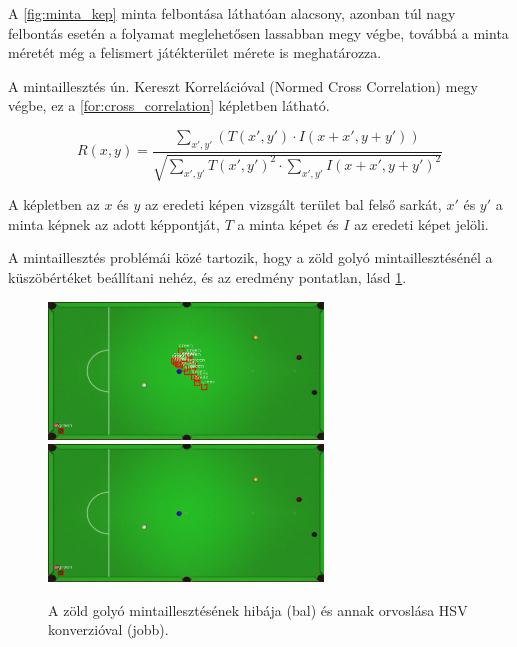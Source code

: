 \par A \ref{fig:minta_kep} minta felbontása láthatóan alacsony, azonban túl nagy felbontás esetén a folyamat meglehetősen lassabban megy végbe, továbbá a minta méretét még a felismert játékterület mérete is meghatározza.
\par A mintaillesztés ún. Kereszt Korrelációval (Normed Cross Correlation) megy végbe, ez a \ref{for:cross_correlation} képletben látható\cite{kaehler2016learning, opencv_docs}.

\begin{equation}
    R(x, y) = \frac{\sum_{x',y'}(T(x',y') \cdot I(x + x', y + y'))}{\sqrt{\sum_{x',y'}T(x',y')^2 \cdot \sum_{x',y'}I(x + x',y + y')^2}}
    \label{for:cross_correlation}
\end{equation}

\par A képletben az $x$ és $y$ az eredeti képen vizsgált terület bal felső sarkát, $x'$ és $y'$ a minta képnek az adott képpontját, $T$ a minta képet és $I$ az eredeti képet jelöli.
\par A mintaillesztés problémái közé tartozik, hogy a zöld golyó mintaillesztésénél a küszöbértéket beállítani nehéz, és az eredmény pontatlan, lásd \ref{fig:rossz_zold}.

\begin{figure}[!ht]
    \centering
    \includegraphics[width=73mm, keepaspectratio]{figures/wrong_green.png}\hspace{2mm}
	\includegraphics[width=73mm, keepaspectratio]{figures/green_ok.png}\\\vspace{5mm}
    \caption{A zöld golyó mintaillesztésének hibája (bal) és annak orvoslása HSV konverzióval (jobb).}
    \label{fig:rossz_zold}
\end{figure}

